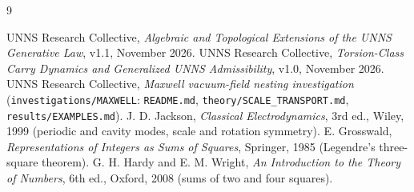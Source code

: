 \documentclass[11pt,a4paper]{article}
\theoremstyle{definition}
\theoremstyle{remark}
\begin{document}
\begin{thebibliography}{9}\small\raggedright
{} UNNS Research Collective, \emph{Algebraic and Topological Extensions of the UNNS Generative Law}, v1.1, November 2026.
 UNNS Research Collective, \emph{Torsion-Class Carry Dynamics and Generalized UNNS Admissibility}, v1.0, November 2026.
 UNNS Research Collective, \emph{Maxwell vacuum-field nesting investigation} (\texttt{investigations/MAXWELL}: \texttt{README.md}, \texttt{theory/SCALE\_TRANSPORT.md}, \texttt{results/EXAMPLES.md}).
 J. D. Jackson, \emph{Classical Electrodynamics}, 3rd ed., Wiley, 1999 (periodic and cavity modes, scale and rotation symmetry).
 E. Grosswald, \emph{Representations of Integers as Sums of Squares}, Springer, 1985 (Legendre's three-square theorem).
 G. H. Hardy and E. M. Wright, \emph{An Introduction to the Theory of Numbers}, 6th ed., Oxford, 2008 (sums of two and four squares).
\end{thebibliography}
\end{document}
